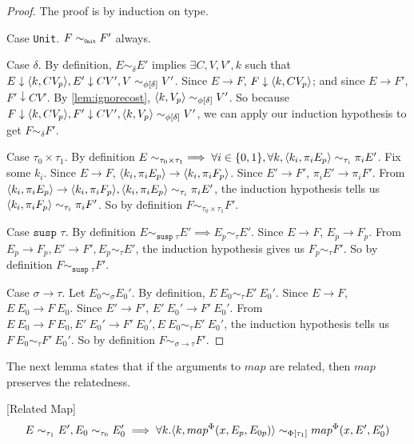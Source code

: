 \begin{proof}
  The proof is by induction on type.

  Case \texttt{Unit}.
  $F \sim_{\texttt{\tiny{Unit}}} F'$ always.

  Case $\delta$.
  By definition, $E \sim_\delta E'$ implies $\exists C, V, V', k$ such that $E \downarrow \langle k, C V_p \rangle, E' \downarrow C V', V \sim_{\phi[\delta]} V'$.
  Since $E \to F$, $F \downarrow \langle k, C V_p \rangle$; and since $E \to F'$, $F' \downarrow C V'$.
  By \ref{lem:ignorecost}, $\langle k, V_p \rangle \sim_{\phi[\delta]} V'$.
  So because $F \downarrow \langle k, C V_p \rangle, F' \downarrow C V', \langle k, V_p \rangle \sim_{\phi[\delta]} V'$, we can apply our induction hypothesis to get $F \sim_\delta F'$.

  Case $\tau_0 \times \tau_1$.
  By definition $E \sim_{\tau_0 \times \tau_1} \implies \forall i \in \{0, 1\}, \forall k, \langle k_i, \pi_i E_p \rangle \sim_{\tau_i} \pi_i E'$.
  Fix some $k_i$.
  Since $E \to F$, $\langle k_i, \pi_i E_p \rangle \to \langle k_i, \pi_i F_p \rangle$.
  Since $E' \to F'$, $\pi_i E' \to \pi_i F'$.
  From $\langle k_i, \pi_i E_p \rangle \to \langle k_i, \pi_i F_p \rangle, \langle k_i, \pi_i E_p \rangle \sim_{\tau_i} \pi_i E'$, the induction hypothesis tells us $\langle k_i, \pi_i F_p \rangle \sim_{\tau_i} \pi_i F'$.
  So by definition $F \sim_{\tau_0 \times \tau_1} F'$.

  Case $\texttt{susp } \tau$.
  By definition $E \sim_{\texttt{susp }\tau} E' \implies E_p \sim_\tau E'$.
  Since $E \to F$, $E_p \to F_p$.
  From $E_p \to F_p, E' \to F', E_p \sim_\tau E'$, the induction hypothesis gives us $F_p \sim_\tau F'$.
  So by definition $F \sim_{\texttt{susp }\tau} F'$.

  Case $\sigma \to \tau$.
  Let $E_0 \sim_\sigma E_0'$.
  By definition, $E\ E_0 \sim_\tau E'\ E_0'$.
  Since $E \to F$, $E\ E_0 \to F\ E_0$.
  Since $E' \to F'$, $E'\ E_0' \to F'\ E_0'$.
  From $E\ E_0 \to F\ E_0, E'\ E_0' \to F'\ E_0', E\ E_0 \sim_\tau E'\ E_0'$, the induction hypothesis tells us $F\ E_0 \sim_\tau F'\ E_0'$.
  So by definition $F \sim_{\sigma \to \tau} F'$.
\end{proof}
%
The next lemma states that if the arguments to $map$ are related, then $map$ preserves the relatedness.
%
\begin{lemma}
  \label{lem:relatedmap}[Related Map]
  \[ E \sim_{\tau_1} E', E_0 \sim_{\tau_0} E_0' \implies \forall k. \langle k, map^\Phi(x, E_p, E_{0p})\rangle \sim_{\Phi[\tau_1]} map^\Phi(x, E', E_0') \]
\end{lemma}
%
